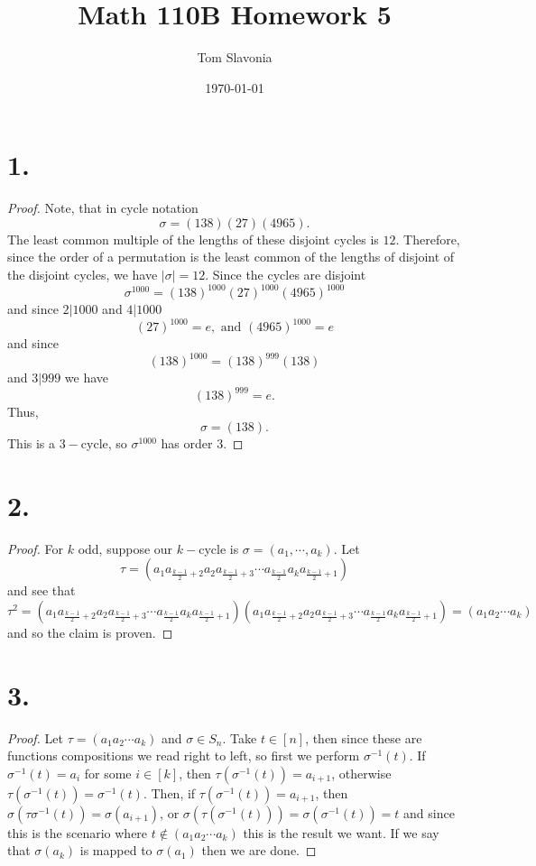 \documentclass{article}
\title{Math 110B Homework 5}
\author{Tom Slavonia}
\date{\today}
\begin{document}
\maketitle

\section*{1.}
\begin{proof}
   Note, that in cycle notation 
   \[
   \sigma = (138)(27)(4965).  
   \] 
   The least common multiple of the lengths of these disjoint cycles is $12$. Therefore, since the order of a permutation is the least common of the lengths of disjoint of the disjoint cycles, we have $|\sigma| = 12$. Since the cycles are disjoint 
   \[
   \sigma^1000 = (138)^{1000}(27)^{1000}(4965)^{1000} 
   \] 
   and since $2|1000$ and $4|1000$
   \[
   (27)^{1000} = e, \text{ and } (4965)^{1000} = e 
   \]
   and since 
   \[
   (138)^{1000} = (138)^{999}(138) 
   \]
   and $3|999$ we have 
   \[
   (138)^{999} = e. 
   \]
   Thus, 
   \[
   \sigma = (138).  
   \]
   This is a $3-$cycle, so $\sigma^{1000}$ has order $3$. 
\end{proof}

\section*{2.}
\begin{proof}
 For $k$ odd, suppose our $k-$cycle is $\sigma = (a_1, \cdots, a_k)$. Let \[
 \tau = (a_1 a_{\frac{k - 1}{2} + 2}a_2 a_{\frac{k - 1}{2} + 3} \cdots a_{\frac{k - 1}{2}}a_ka_{\frac{k - 1}{2} + 1}) 
 \]
 and see that 
 \[
 \tau^2 =  (a_1 a_{\frac{k - 1}{2} + 2}a_2 a_{\frac{k - 1}{2} + 3} \cdots a_{\frac{k - 1}{2}}a_ka_{\frac{k - 1}{2} + 1})(a_1 a_{\frac{k - 1}{2} + 2}a_2 a_{\frac{k - 1}{2} + 3} \cdots a_{\frac{k - 1}{2}}a_ka_{\frac{k - 1}{2} + 1}) = (a_1 a_2 \cdots a_k)
 \] 
 and so the claim is proven. 
\end{proof}
\section*{3.}
\begin{proof}
  Let $\tau = (a_1a_2\cdots a_k)$ and $\sigma \in S_n$. Take $t \in [n]$, then since these are functions compositions we read right to left, so first we perform $\sigma^{-1}(t)$. If $\sigma^{-1}(t) = a_i$ for some $i \in [k]$, then $\tau(\sigma^{-1}(t)) = a_{i + 1}$, otherwise $\tau(\sigma^{-1}(t)) = \sigma^{-1}(t)$. Then, if $\tau(\sigma^{-1}(t)) = a_{i + 1}$, then $\sigma(\tau\sigma^{-1}(t)) = \sigma(a_{i + 1})$, or $\sigma(\tau(\sigma^{-1}(t))) = \sigma(\sigma^{-1}(t)) = t$ and since this is the scenario where $t \notin (a_1 a_2 \cdots a_k)$ this is the result we want. If we say that $\sigma(a_k)$ is mapped to $\sigma(a_1)$ then we are done. 
\end{proof}
\end{document}
